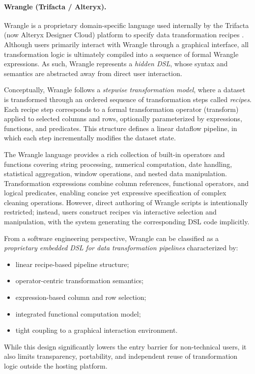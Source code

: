 \paragraph{Wrangle (Trifacta / Alteryx).}
Wrangle is a proprietary domain-specific language used internally by the Trifacta (now Alteryx Designer Cloud) platform to specify data transformation recipes \cite{wrangle-language}. 
Although users primarily interact with Wrangle through a graphical interface, all transformation logic is ultimately compiled into a sequence of formal Wrangle expressions. 
As such, Wrangle represents a \emph{hidden DSL}, whose syntax and semantics are abstracted away from direct user interaction.

Conceptually, Wrangle follows a \emph{stepwise transformation model}, where a dataset is transformed through an ordered sequence of transformation steps called \emph{recipes}. 
Each recipe step corresponds to a formal transformation operator (transform) applied to selected columns and rows, optionally parameterized by expressions, functions, and predicates. 
This structure defines a linear dataflow pipeline, in which each step incrementally modifies the dataset state.

The Wrangle language provides a rich collection of built-in operators and functions covering string processing, numerical computation, date handling, statistical aggregation, window operations, and nested data manipulation. 
Transformation expressions combine column references, functional operators, and logical predicates, enabling concise yet expressive specification of complex cleaning operations. 
However, direct authoring of Wrangle scripts is intentionally restricted; instead, users construct recipes via interactive selection and manipulation, with the system generating the corresponding DSL code implicitly.

From a software engineering perspective, Wrangle can be classified as a \emph{proprietary embedded DSL for data transformation pipelines} characterized by:
\begin{itemize}[label=-, noitemsep]
    \item linear recipe-based pipeline structure;
    \item operator-centric transformation semantics;
    \item expression-based column and row selection;
    \item integrated functional computation model;
    \item tight coupling to a graphical interaction environment.
\end{itemize}
While this design significantly lowers the entry barrier for non-technical users, it also limits transparency, portability, and independent reuse of transformation logic outside the hosting platform.

